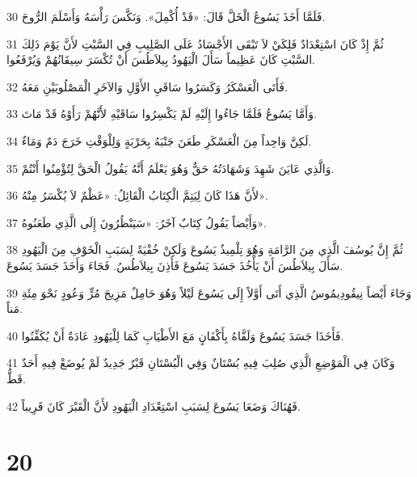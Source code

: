 \par 30 فَلَمَّا أَخَذَ يَسُوعُ الْخَلَّ قَالَ: «قَدْ أُكْمِلَ». وَنَكَّسَ رَأْسَهُ وَأَسْلَمَ الرُّوحَ.
\par 31 ثُمَّ إِذْ كَانَ اسْتِعْدَادٌ فَلِكَيْ لاَ تَبْقَى الأَجْسَادُ عَلَى الصَّلِيبِ فِي السَّبْتِ لأَنَّ يَوْمَ ذَلِكَ السَّبْتِ كَانَ عَظِيماً سَأَلَ الْيَهُودُ بِيلاَطُسَ أَنْ تُكْسَرَ سِيقَانُهُمْ وَيُرْفَعُوا.
\par 32 فَأَتَى الْعَسْكَرُ وَكَسَرُوا سَاقَيِ الأَوَّلِ وَالآخَرِ الْمَصْلُوبَيْنِ مَعَهُ.
\par 33 وَأَمَّا يَسُوعُ فَلَمَّا جَاءُوا إِلَيْهِ لَمْ يَكْسِرُوا سَاقَيْهِ لأَنَّهُمْ رَأَوْهُ قَدْ مَاتَ.
\par 34 لَكِنَّ وَاحِداً مِنَ الْعَسْكَرِ طَعَنَ جَنْبَهُ بِحَرْبَةٍ وَلِلْوَقْتِ خَرَجَ دَمٌ وَمَاءٌ.
\par 35 وَالَّذِي عَايَنَ شَهِدَ وَشَهَادَتُهُ حَقٌّ وَهُوَ يَعْلَمُ أَنَّهُ يَقُولُ الْحَقَّ لِتُؤْمِنُوا أَنْتُمْ.
\par 36 لأَنَّ هَذَا كَانَ لِيَتِمَّ الْكِتَابُ الْقَائِلُ: «عَظْمٌ لاَ يُكْسَرُ مِنْهُ».
\par 37 وَأَيْضاً يَقُولُ كِتَابٌ آخَرُ: «سَيَنْظُرُونَ إِلَى الَّذِي طَعَنُوهُ».
\par 38 ثُمَّ إِنَّ يُوسُفَ الَّذِي مِنَ الرَّامَةِ وَهُوَ تِلْمِيذُ يَسُوعَ وَلَكِنْ خُفْيَةً لِسَبَبِ الْخَوْفِ مِنَ الْيَهُودِ سَأَلَ بِيلاَطُسَ أَنْ يَأْخُذَ جَسَدَ يَسُوعَ فَأَذِنَ بِيلاَطُسُ. فَجَاءَ وَأَخَذَ جَسَدَ يَسُوعَ.
\par 39 وَجَاءَ أَيْضاً نِيقُودِيمُوسُ الَّذِي أَتَى أَوَّلاً إِلَى يَسُوعَ لَيْلاً وَهُوَ حَامِلٌ مَزِيجَ مُرٍّ وَعُودٍ نَحْوَ مِئَةِ مَناً.
\par 40 فَأَخَذَا جَسَدَ يَسُوعَ وَلَفَّاهُ بِأَكْفَانٍ مَعَ الأَطْيَابِ كَمَا لِلْيَهُودِ عَادَةٌ أَنْ يُكَفِّنُوا.
\par 41 وَكَانَ فِي الْمَوْضِعِ الَّذِي صُلِبَ فِيهِ بُسْتَانٌ وَفِي الْبُسْتَانِ قَبْرٌ جَدِيدٌ لَمْ يُوضَعْ فِيهِ أَحَدٌ قَطُّ.
\par 42 فَهُنَاكَ وَضَعَا يَسُوعَ لِسَبَبِ اسْتِعْدَادِ الْيَهُودِ لأَنَّ الْقَبْرَ كَانَ قَرِيباً.

\chapter{20}

